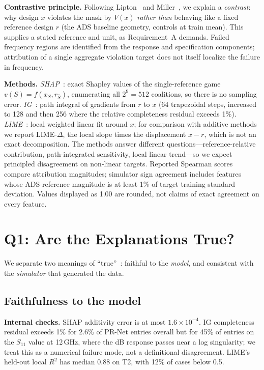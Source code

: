 \documentclass[conference,10pt]{IEEEtran}
\newcommand{\lime}{LIME-$\Delta$}
\begin{document}
\textbf{Contrastive principle.} Following Lipton~\cite{lipton1990} and Miller~\cite{miller2019}, we explain a \emph{contrast}: why design $x$ violates the mask by $V(x)$ \emph{rather than} behaving like a fixed reference design $r$ (the ADS baseline geometry, controls at train mean).
This supplies a stated reference and unit, as Requirement~A demands. Failed frequency regions are identified from the response and specification components; attribution of a single aggregate violation target does not itself localize the failure in frequency.

\textbf{Methods.}
\emph{SHAP}~\cite{lundberg2017,shapley1953}: exact Shapley values of the single-reference game $v(S)=f(x_S,r_{\bar S})$, enumerating all $2^9=512$ coalitions, so there is no sampling error.
\emph{IG}~\cite{sundararajan2017}: path integral of gradients from $r$ to $x$ (64 trapezoidal steps, increased to 128 and then 256 where the relative completeness residual exceeds 1\%).
\emph{LIME}~\cite{ribeiro2016}: local weighted linear fit around $x$; for comparison with additive methods we report \lime, the local slope times the displacement $x-r$, which is not an exact decomposition.
The methods answer different questions---reference-relative contribution, path-integrated sensitivity, local linear trend---so we expect principled disagreement on non-linear targets.
Reported Spearman scores compare attribution magnitudes; simulator sign agreement includes features whose ADS-reference magnitude is at least 1\% of target training standard deviation. Values displayed as 1.00 are rounded, not claims of exact agreement on every feature.

\section{Q1: Are the Explanations True?}
We separate two meanings of ``true''~\cite{jacovi2020}: faithful to the \emph{model}, and consistent with the \emph{simulator} that generated the data.

\subsection{Faithfulness to the model}
\label{sec:q1model}
\textbf{Internal checks.} SHAP additivity error is at most $1.6\times10^{-4}$.
IG completeness residual exceeds 1\% for 2.6\% of PR-Net entries overall but for 45\% of entries on the $S_{11}$ value at 12\,GHz, where the dB response passes near a log singularity; we treat this as a numerical failure mode, not a definitional disagreement.
LIME's held-out local $R^2$ has median 0.88 on T2, with 12\% of cases below 0.5.
\end{document}
